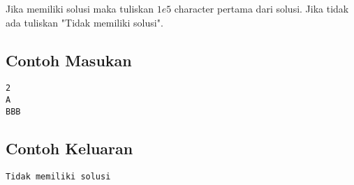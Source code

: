 \documentclass{article}
\begin{document}
Jika memiliki solusi maka tuliskan $1e5$ character pertama dari solusi. Jika tidak ada tuliskan "Tidak memiliki solusi".
\\

\begin{multicols}{2}
\subsection*{Contoh Masukan}
\begin{lstlisting}
2
A
BBB
\end{lstlisting}
\columnbreak
\subsection*{Contoh Keluaran}
\begin{lstlisting}
Tidak memiliki solusi
\end{lstlisting}
\vfill
\null
\end{multicols}

\pagebreak
\end{document}
